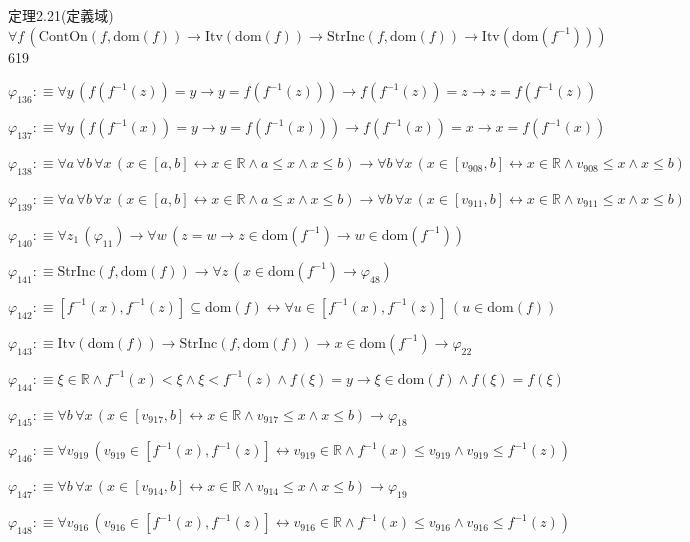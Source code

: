 \begin{fullproof}{定理2.21(定義域)}{$\forall f\,(\mathrm{ContOn}(f,\mathrm{dom}(f)) \to \mathrm{Itv}(\mathrm{dom}(f)) \to \mathrm{StrInc}(f,\mathrm{dom}(f)) \to \mathrm{Itv}(\mathrm{dom}(f^{-1})))$}{619}
\begin{abbrevlist}
\item $\varphi_{136} :\equiv \forall y\,(f(f^{-1}(z)) = y \to y = f(f^{-1}(z))) \to f(f^{-1}(z)) = z \to z = f(f^{-1}(z))$
\item $\varphi_{137} :\equiv \forall y\,(f(f^{-1}(x)) = y \to y = f(f^{-1}(x))) \to f(f^{-1}(x)) = x \to x = f(f^{-1}(x))$
\item $\varphi_{138} :\equiv \forall a\,\forall b\,\forall x\,(x \in [a,b] \leftrightarrow x \in \mathbb{R} \land a \leq x \land x \leq b) \to \forall b\,\forall x\,(x \in [v_{908},b] \leftrightarrow x \in \mathbb{R} \land v_{908} \leq x \land x \leq b)$
\item $\varphi_{139} :\equiv \forall a\,\forall b\,\forall x\,(x \in [a,b] \leftrightarrow x \in \mathbb{R} \land a \leq x \land x \leq b) \to \forall b\,\forall x\,(x \in [v_{911},b] \leftrightarrow x \in \mathbb{R} \land v_{911} \leq x \land x \leq b)$
\item $\varphi_{140} :\equiv \forall z_{1}\,(\varphi_{11}) \to \forall w\,(z = w \to z \in \mathrm{dom}(f^{-1}) \to w \in \mathrm{dom}(f^{-1}))$
\item $\varphi_{141} :\equiv \mathrm{StrInc}(f,\mathrm{dom}(f)) \to \forall z\,(x \in \mathrm{dom}(f^{-1}) \to \varphi_{48})$
\item $\varphi_{142} :\equiv [f^{-1}(x),f^{-1}(z)] \subseteq \mathrm{dom}(f) \leftrightarrow \forall u \in [f^{-1}(x),f^{-1}(z)]\,(u \in \mathrm{dom}(f))$
\item $\varphi_{143} :\equiv \mathrm{Itv}(\mathrm{dom}(f)) \to \mathrm{StrInc}(f,\mathrm{dom}(f)) \to x \in \mathrm{dom}(f^{-1}) \to \varphi_{22}$
\item $\varphi_{144} :\equiv \xi \in \mathbb{R} \land f^{-1}(x) < \xi \land \xi < f^{-1}(z) \land f(\xi) = y \to \xi \in \mathrm{dom}(f) \land f(\xi) = f(\xi)$
\item $\varphi_{145} :\equiv \forall b\,\forall x\,(x \in [v_{917},b] \leftrightarrow x \in \mathbb{R} \land v_{917} \leq x \land x \leq b) \to \varphi_{18}$
\item $\varphi_{146} :\equiv \forall v_{919}\,(v_{919} \in [f^{-1}(x),f^{-1}(z)] \leftrightarrow v_{919} \in \mathbb{R} \land f^{-1}(x) \leq v_{919} \land v_{919} \leq f^{-1}(z))$
\item $\varphi_{147} :\equiv \forall b\,\forall x\,(x \in [v_{914},b] \leftrightarrow x \in \mathbb{R} \land v_{914} \leq x \land x \leq b) \to \varphi_{19}$
\item $\varphi_{148} :\equiv \forall v_{916}\,(v_{916} \in [f^{-1}(x),f^{-1}(z)] \leftrightarrow v_{916} \in \mathbb{R} \land f^{-1}(x) \leq v_{916} \land v_{916} \leq f^{-1}(z))$

\end{abbrevlist}
\end{fullproof}
